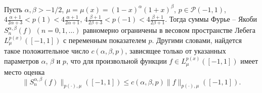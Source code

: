 \begin{theorem}
Пусть $\alpha,\beta>-1/2$, $\mu=\mu(x)=(1-x)^\alpha(1+x)^\beta$, $p\in\mathcal{ P}(-1,1)$,
$4\frac{\alpha+1}{2\alpha+3}<p(1)<4\frac{\alpha+1}{2\alpha+1}$, $4\frac{\beta+1}{2\beta+3}<p(-1)<4\frac{\beta+1}{2\beta+1}$.
Тогда суммы Фурье -- Якоби $S_n^{\alpha,\beta}(f)$ $(n=0,1,\ldots)$ равномерно ограничены в весовом пространстве
Лебега $L_\mu^{p(x)}([-1,1])$ с переменным показателем $p$. Другими словами, найдется такое положительное число $c(\alpha,\beta,p)$, зависящее только от указанных параметров $\alpha$, $\beta$ и $p$, что для произвольной функции $f\in L_\mu^{p(x)}([-1,1])$ имеет место оценка
\begin{equation}\label{8.91}
\|S_n^{\alpha,\beta}(f)\|_{p(\cdot),\mu}([-1,1])\le c(\alpha,\beta,p)\|f\|_{p(\cdot),\mu}([-1,1]).
\end{equation}
\end{theorem}
%
%



